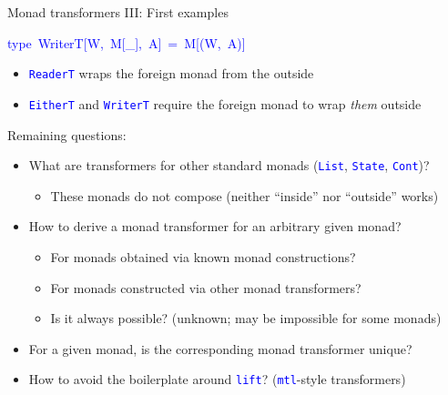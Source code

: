 \documentclass[english]{beamer}
\newenvironment{lyxcode}
  {\par\begin{list}{}{
    \setlength{\rightmargin}{\leftmargin}
    \setlength{\listparindent}{0pt}%
    \raggedright
    \setlength{\itemsep}{0pt}
    \setlength{\parsep}{0pt}
    \normalfont\ttfamily}%
   \def\{{\char`\{}
   \def\}{\char`\}}
   \def\textasciitilde{\char`\~}
   \item[]}
  {\end{list}}
\begin{document}
\begin{frame}{Monad transformers III: First examples}
\begin{lyxcode}
\textcolor{blue}{\footnotesize{}type~WriterT{[}W,~M{[}\_{]},~A{]}~=~M{[}(W,~A){]}}{\footnotesize\par}
\end{lyxcode}
\begin{itemize}
\item {\footnotesize{}\vspace{-0.2cm}}\texttt{\textcolor{blue}{\footnotesize{}ReaderT}}
wraps the foreign monad from the outside
\item \texttt{\textcolor{blue}{\footnotesize{}EitherT}} and \texttt{\textcolor{blue}{\footnotesize{}WriterT}}
require the foreign monad to wrap \emph{them} outside
\end{itemize}
Remaining questions:
\begin{itemize}
\item What are transformers for other standard monads (\texttt{\textcolor{blue}{\footnotesize{}List}},
\texttt{\textcolor{blue}{\footnotesize{}State}}, \texttt{\textcolor{blue}{\footnotesize{}Cont}})?
\begin{itemize}
\item These monads do not compose (neither ``inside'' nor ``outside''
works)
\end{itemize}
\item How to derive a monad transformer for an arbitrary given monad?
\begin{itemize}
\item For monads obtained via known monad constructions?
\item For monads constructed via other monad transformers?
\item Is it always possible? (unknown; may be impossible for some monads)
\end{itemize}
\item For a given monad, is the corresponding monad transformer unique?
\item How to avoid the boilerplate around \texttt{\textcolor{blue}{\footnotesize{}lift}}?
(\texttt{\textcolor{blue}{\footnotesize{}mtl}}-style transformers)
\end{itemize}
\end{frame}
\end{document}
